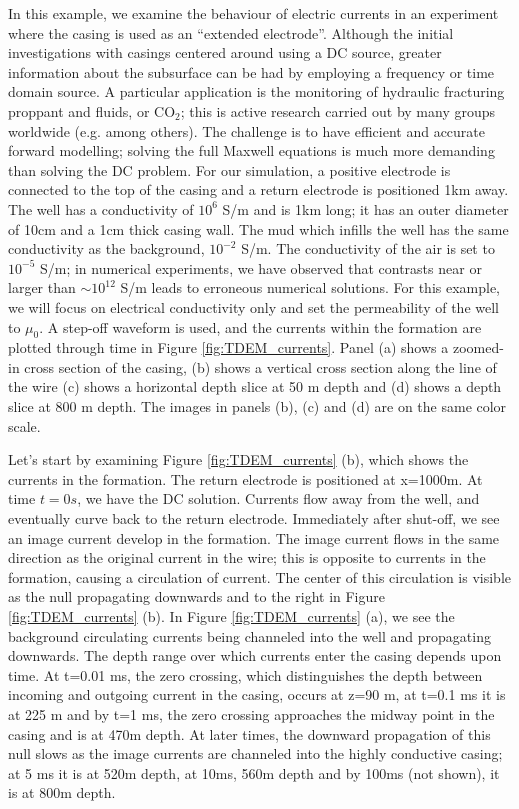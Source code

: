 In this example, we examine the behaviour of electric currents in an experiment where the casing is used as an ``extended electrode''. Although the initial investigations with casings centered around using a DC source, greater information about the subsurface can be had by employing a frequency or time domain source. A particular application is the monitoring of hydraulic fracturing proppant and fluids, or CO$_2$; this is active research carried out by many groups worldwide (e.g. \cite{Hoversten2015, Um2015, Puzyrev2017, Zhang2018} among others). The challenge is to have efficient and accurate forward modelling; solving the full Maxwell equations is much more demanding than solving the DC problem. For our simulation, a positive electrode is connected to the top of the casing and a return electrode is positioned 1km away. The well has a conductivity of $10^6$ S/m and is 1km long; it has an outer diameter of 10cm and a 1cm thick casing wall. The mud which infills the well has the same conductivity as the background, $10^{-2}$ S/m. The conductivity of the air is set to $10^{-5}$ S/m; in numerical experiments, we have observed that contrasts near or larger than $\sim 10^{12}$ S/m leads to erroneous numerical solutions. For this example, we will focus on electrical conductivity only and set the permeability of the well to $\mu_0$. A step-off waveform is used, and the currents within the formation are plotted through time in Figure \ref{fig:TDEM_currents}. Panel (a) shows a zoomed-in cross section of the casing, (b) shows a vertical cross section along the line of the wire (c) shows a horizontal depth slice at 50 m depth and (d) shows a depth slice at 800 m depth. The images in panels (b), (c) and (d) are on the same color scale.

Let's start by examining Figure \ref{fig:TDEM_currents} (b), which shows the currents in the formation. The return electrode is positioned at x=1000m. At time $t=0s$, we have the DC solution. Currents flow away from the well, and eventually curve back to the return electrode. Immediately after shut-off, we see an image current develop in the formation. The image current flows in the same direction as the original current in the wire; this is opposite to currents in the formation, causing a circulation of current. The center of this circulation is visible as the null propagating downwards and to the right in Figure \ref{fig:TDEM_currents} (b). In Figure \ref{fig:TDEM_currents} (a), we see the background circulating currents being channeled into the well and propagating downwards. The depth range over which currents enter the casing depends upon time. At t=0.01 ms, the zero crossing, which distinguishes the depth between incoming and outgoing current in the casing, occurs at z=90 m, at t=0.1 ms it is at 225 m and by t=1 ms, the zero crossing approaches the midway point in the casing and is at 470m depth. At later times, the downward propagation of this null slows as the image currents are channeled into the highly conductive casing; at 5 ms it is at 520m depth, at 10ms, 560m depth and by 100ms (not shown), it is at 800m depth.

